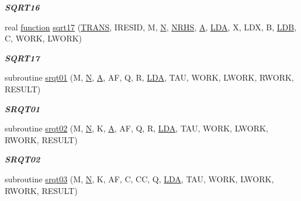 \begin{DoxyCompactItemize}
\begin{DoxyCompactList}\small\item\em {\bfseries S\+Q\+R\+T16} \end{DoxyCompactList}\item 
real \hyperlink{afunc_8m_a7b5e596df91eadea6c537c0825e894a7}{function} \hyperlink{group__single__lin_ga2824f429107e0bf7f3c9078c481efe62}{sqrt17} (\hyperlink{superlu__enum__consts_8h_a0c4e17b2d5cea33f9991ccc6a6678d62a1f61e3015bfe0f0c2c3fda4c5a0cdf58}{T\+R\+A\+N\+S}, I\+R\+E\+S\+I\+D, M, \hyperlink{polmisc_8c_a0240ac851181b84ac374872dc5434ee4}{N}, \hyperlink{example__user_8c_aa0138da002ce2a90360df2f521eb3198}{N\+R\+H\+S}, \hyperlink{classA}{A}, \hyperlink{example__user_8c_ae946da542ce0db94dced19b2ecefd1aa}{L\+D\+A}, X, L\+D\+X, B, \hyperlink{example__user_8c_a50e90a7104df172b5a89a06c47fcca04}{L\+D\+B}, C, W\+O\+R\+K, L\+W\+O\+R\+K)
\begin{DoxyCompactList}\small\item\em {\bfseries S\+Q\+R\+T17} \end{DoxyCompactList}\item 
subroutine \hyperlink{group__single__lin_ga73a0ee00e2962471858edb4ed8a433e7}{srqt01} (M, \hyperlink{polmisc_8c_a0240ac851181b84ac374872dc5434ee4}{N}, \hyperlink{classA}{A}, A\+F, Q, R, \hyperlink{example__user_8c_ae946da542ce0db94dced19b2ecefd1aa}{L\+D\+A}, T\+A\+U, W\+O\+R\+K, L\+W\+O\+R\+K, R\+W\+O\+R\+K, R\+E\+S\+U\+L\+T)
\begin{DoxyCompactList}\small\item\em {\bfseries S\+R\+Q\+T01} \end{DoxyCompactList}\item 
subroutine \hyperlink{group__single__lin_ga13923d12b9e1dccbbc7fe0e7a23cd2a8}{srqt02} (M, \hyperlink{polmisc_8c_a0240ac851181b84ac374872dc5434ee4}{N}, K, \hyperlink{classA}{A}, A\+F, Q, R, \hyperlink{example__user_8c_ae946da542ce0db94dced19b2ecefd1aa}{L\+D\+A}, T\+A\+U, W\+O\+R\+K, L\+W\+O\+R\+K, R\+W\+O\+R\+K, R\+E\+S\+U\+L\+T)
\begin{DoxyCompactList}\small\item\em {\bfseries S\+R\+Q\+T02} \end{DoxyCompactList}\item 
subroutine \hyperlink{group__single__lin_ga37eef00c35e27ecd593e7b7aae51ff35}{srqt03} (M, \hyperlink{polmisc_8c_a0240ac851181b84ac374872dc5434ee4}{N}, K, A\+F, C, C\+C, Q, \hyperlink{example__user_8c_ae946da542ce0db94dced19b2ecefd1aa}{L\+D\+A}, T\+A\+U, W\+O\+R\+K, L\+W\+O\+R\+K, R\+W\+O\+R\+K, R\+E\+S\+U\+L\+T)

\end{DoxyCompactItemize}
